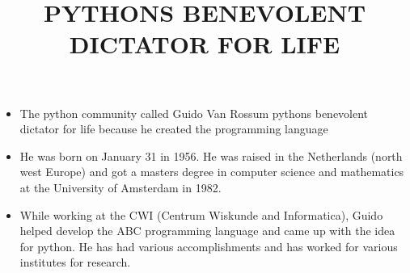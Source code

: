 \documentclass{article}
\title{PYTHONS BENEVOLENT DICTATOR FOR LIFE}
\begin{document}
	\maketitle
	\begin{itemize}
		\item The python community called Guido Van Rossum pythons benevolent dictator for life because he created the programming language
		
		\item He was born on January 31 in 1956. He was raised in the Netherlands (north west Europe) and got a masters degree in computer science and mathematics at the University of Amsterdam in 1982.
		
		\item While working at the CWI (Centrum Wiskunde and Informatica), Guido helped develop the ABC programming language and came up with the idea for python. He has had various accomplishments and has worked for various institutes for research.                                                                                                                                                                                                                                                                                                                                                                                                                                                                                                                                                                                                                                                                                                                                                                                                                                                                                                                                                                                                                                                                                                                                                                                                                                                                                                                                                                                                                                                                                                                                                                                                                                                                                                                                                                                                                                                                                                                                                                                                                                                                                                                                                                                                                                                                                                                                                                                           
\end{itemize}
\end{document}
